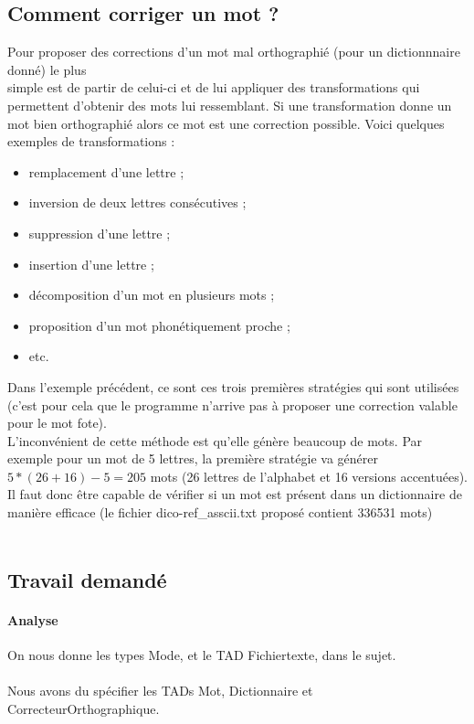 \subsection{Comment corriger un mot ?}
Pour proposer des corrections d'un mot mal orthographié (pour un dictionnnaire donné) le plus\\simple est de partir de celui-ci et de lui appliquer des transformations qui permettent d'obtenir des mots lui ressemblant. Si une transformation donne un mot bien orthographié alors ce mot est une correction possible. Voici quelques exemples de transformations :
\begin{itemize}
\item remplacement d'une lettre ;
\item inversion de deux lettres consécutives ;
\item suppression d'une lettre ;
\item insertion d'une lettre ;
\item décomposition d'un mot en plusieurs mots ;
\item proposition d'un mot phonétiquement proche ;
\item etc.
\end{itemize}

Dans l'exemple précédent, ce sont ces trois premières stratégies qui sont utilisées (c'est pour cela que le programme n'arrive pas à proposer une correction valable pour le mot fote).\\
L'inconvénient de cette méthode est qu'elle génère beaucoup de mots. Par exemple pour un mot de 5 lettres, la première stratégie va générer $5 *(26 + 16) -5 = 205$ mots (26 lettres de l'alphabet et 16 versions accentuées). Il faut donc être capable de vérifier si un mot est présent dans un dictionnaire de manière efficace (le fichier dico-ref\_asscii.txt proposé contient 336531 mots)\\
\\
\subsection{Travail demandé}
\paragraph{Analyse}
On nous donne les types Mode, et le TAD Fichiertexte, dans le sujet.\\
\\
Nous avons du spécifier les TADs Mot, Dictionnaire et CorrecteurOrthographique.\\
